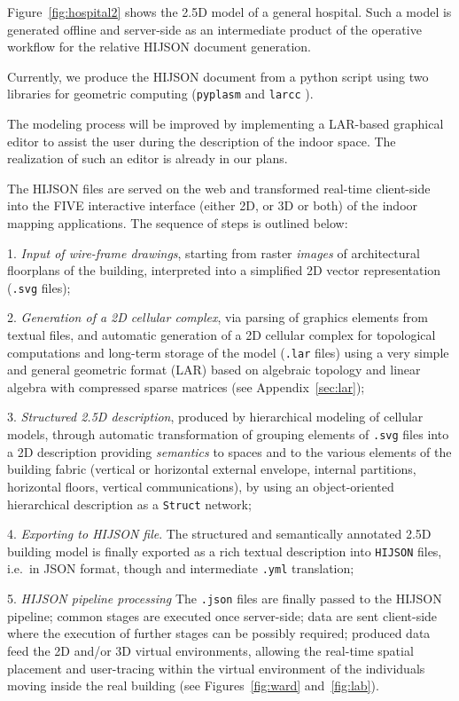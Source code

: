 Figure~\ref{fig:hospital2} shows the 2.5D model of a general hospital. Such a
model is generated offline and server-side as an intermediate product of the
operative workflow for the relative HIJSON document generation.

Currently, we produce the HIJSON document from a python
script using two libraries for geometric computing (\texttt{pyplasm} and \texttt{larcc} \cite{Dicarlo:2014:TNL:2543138.2543294,paoluzziMS:2014,cadanda:2015}).


The modeling process will be improved by implementing a LAR-based 
graphical editor to assist the user during the description of the indoor
space. The realization of such an editor is already in our plans.


The HIJSON  files are served on the web and transformed real-time client-side into the FIVE interactive interface (either 2D, or 3D or both) of the indoor mapping applications. The sequence of steps is outlined below:

1. \textit{Input of wire-frame drawings},
  starting from   raster \emph{images} of architectural floorplans of the building, interpreted into a simplified 2D vector representation (\texttt{.svg} files);

2. \textit{Generation of a 2D cellular complex}, via
  parsing of graphics elements from textual files, and automatic generation of a 2D cellular complex for topological computations and long-term storage of the model (\texttt{.lar} files) using a very simple and general geometric format (LAR) based on algebraic topology and linear algebra with compressed sparse matrices (see Appendix~\ref{sec:lar});

3. \textit{Structured 2.5D description}, produced by
  hierarchical modeling of cellular models, through automatic transformation of grouping elements of \texttt{.svg} files into a 2D description providing \emph{semantics} to spaces and  to the various elements of the building fabric (vertical or horizontal external envelope, internal partitions, horizontal floors, vertical communications), by using an object-oriented hierarchical description as a  \texttt{Struct} network;

4. \textit{Exporting to HIJSON file}.
The  structured and semantically annotated 2.5D building model is finally  exported as a rich textual description into \texttt{HIJSON} files, i.e.~in JSON format, though and intermediate \texttt{.yml} translation;

5. \textit{HIJSON pipeline processing}   The \texttt{.json} files are finally
passed to the HIJSON pipeline;   common stages are executed once server-side;
data are sent client-side where the execution of further stages can be
possibly required; produced data feed the 2D and/or 3D virtual environments,
allowing the real-time spatial placement and   user-tracing within the virtual
environment of the individuals moving   inside the real building (see
Figures~\ref{fig:ward} and~\ref{fig:lab}).

